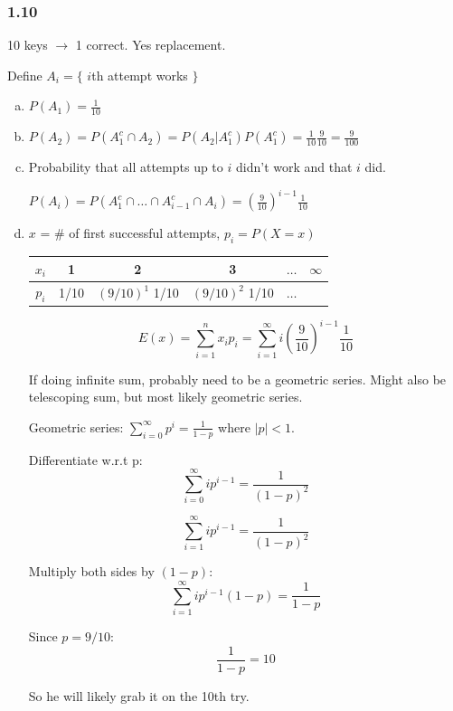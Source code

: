 \documentclass{report}
\begin{document}
\subsubsection*{1.10}


10 keys $\rightarrow$ 1 correct. Yes replacement.

Define $A_i = \{ $ $i$th attempt works $\}$

\begin{enumerate}[(a)]
\item $P(A_1) = \frac{1}{10}$
\item $P(A_2) = P(A_1^c \cap A_2) = P(A_2|A_1^c) P(A_1^c) = \frac{1}{10} \frac{9}{10} = \frac{9}{100}$


\item Probability that all attempts up to $i$ didn't work and that $i$ did. 

$P(A_i) = P(A_1^c \cap \dots \cap A_{i-1}^c \cap A_i) = (\frac{9}{10})^{i-1} \frac{1}{10}$

\item  $x$ = \# of first successful attempts, $p_i = P(X = x)$

\begin{table}[H]
\centering
\begin{tabular}{c|ccccc}
\toprule
$x_i$ & 1 & 2 & 3 & $\dots$ & $\infty$ \\
\midrule
$p_i$ & 1/10 & $(9/10)^1$ 1/10 & $(9/10)^2$ 1/10 & $\dots$ & \\
\bottomrule
\end{tabular}
\end{table}

$$
E(x) = \sum_{i=1}^n x_i p_i = \sum_{i=1}^{\infty} i \left(\frac{9}{10}\right)^{i-1} \frac{1}{10}
$$

If doing infinite sum, probably need to be a geometric series. Might also be telescoping sum, but most likely geometric series.

Geometric series: $\sum_{i=0}^{\infty} p^i = \frac{1}{1-p}$ where $|p|<1$.

Differentiate w.r.t p: $$\sum_{i=0}^{\infty} i p^{i-1} = \frac{1}{(1-p)^2} $$

 $$\sum_{i=1}^{\infty} i p^{i-1} = \frac{1}{(1-p)^2} $$

Multiply both sides by $(1-p)$:  $$\sum_{i=1}^{\infty} i p^{i-1} (1-p) = \frac{1}{1-p} $$

Since $p=9/10$: $$\frac{1}{1-p} = 10 $$

So he will likely grab it on the 10th try.


\end{enumerate}
\end{document}
